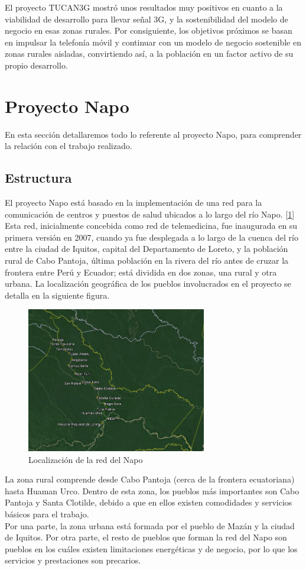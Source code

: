 	El proyecto TUCAN3G mostró unos resultados muy positivos en cuanto a la viabilidad de desarrollo para llevar señal 3G, y la sostenibilidad del modelo de negocio en esas zonas rurales. Por consiguiente, los objetivos próximos se basan en impulsar la telefonía móvil y continuar con un modelo de negocio sostenible en zonas rurales aisladas, convirtiendo así, a la población en un factor activo de su propio desarrollo.    
	
\section{Proyecto Napo}
	En esta sección detallaremos todo lo referente al proyecto Napo, para comprender la relación con el trabajo realizado.
	
	\subsection{Estructura}
	
	El proyecto Napo está basado en la implementación de una red para la comunicación de centros y puestos de salud ubicados a lo largo del río Napo. [\ref{NetNapo}] Esta red, inicialmente concebida como red de telemedicina, fue inaugurada en su primera versión en 2007, cuando ya fue desplegada a lo largo de la cuenca del río entre la ciudad de Iquitos, capital del Departamento de Loreto, y la población rural de Cabo Pantoja, última población en la rivera del río antes de cruzar la frontera entre Perú y Ecuador; está dividida en dos zonas, una rural y otra urbana. La localización geográfica de los pueblos involucrados en el proyecto se detalla en la siguiente figura. 
	\begin{figure}[H]
		\centering
		\includegraphics[width=0.7\textwidth]{img/network.png}
		\caption{Localización de la red del Napo}
		\label{NetNapo}
	\end{figure}
	La zona rural comprende desde Cabo Pantoja (cerca de la frontera ecuatoriana) hasta Huaman Urco. Dentro de esta zona, los pueblos más importantes son Cabo Pantoja y Santa Clotilde, debido a que en ellos existen comodidades y servicios básicos para el trabajo.\\
	Por una parte, la zona urbana está formada por el pueblo de Mazán y la ciudad de Iquitos. Por otra parte, el resto de pueblos que forman la red del Napo son pueblos en los cuáles existen limitaciones energéticas y de negocio, por lo que los servicios y prestaciones son precarios.\\\\
	 
